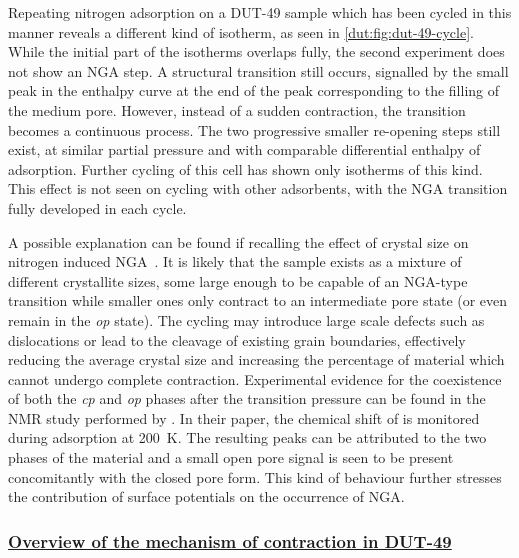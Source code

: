 Repeating nitrogen adsorption on a DUT-49 sample which has been
cycled in this manner reveals a different kind of isotherm, 
as seen in \autoref{dut:fig:dut-49-cycle}. While the initial 
part of the isotherms overlaps fully,
the second experiment does not show an NGA step.
A structural transition still occurs, 
signalled by the small peak in the enthalpy curve at the end of the 
peak corresponding to the filling of the medium pore. However, instead
of a sudden contraction, the transition becomes a continuous 
process. The two progressive smaller re-opening steps still exist,
at similar partial pressure and with comparable differential enthalpy
of adsorption. Further cycling of this cell has shown only isotherms
of this kind. This effect is not seen on cycling with other 
adsorbents, with the NGA transition fully developed in each cycle. 

A possible explanation can be found if recalling the effect 
of crystal size on nitrogen induced 
NGA~\cite{krauseEffectCrystalliteSize2018}. It is likely 
that the sample exists as a mixture of different crystallite
sizes, some large enough to be capable of an NGA-type transition 
while smaller ones only contract to an intermediate pore state
(or even remain in the \textit{op} state).
The cycling may introduce large scale defects such as dislocations
or lead to the cleavage of existing grain boundaries, 
effectively reducing the average crystal size
and increasing the percentage of material which cannot undergo 
complete contraction.
Experimental evidence for the coexistence of both the \textit{cp} and 
\textit{op} phases after the transition pressure can be found in the 
 NMR study performed 
by \citet{schaberSituMonitoringUnique2017}. In their paper,
the chemical shift of  is monitored during
adsorption at \SI{200}{\kelvin}. The resulting peaks can be attributed
to the two phases of the material and a small
open pore signal is seen to be present concomitantly with the 
closed pore form.
This kind of behaviour further stresses the 
contribution of surface potentials on the occurrence of NGA.

\subsubsection{\underline{Overview of the mechanism of contraction in DUT-49}}

